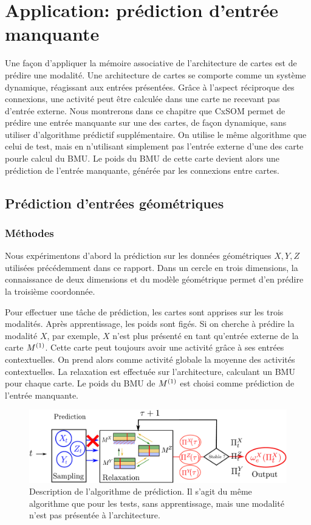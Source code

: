 \chapter{Application: prédiction d'entrée manquante}
\graphicspath{{05-Application/}}
\minitoc

Une façon d'appliquer la mémoire associative de l'architecture de cartes est de prédire une modalité. Une architecture de cartes se comporte comme un système dynamique, réagissant aux entrées présentées.
Grâce à l'aspect réciproque des connexions, une activité peut être calculée dans une carte ne recevant pas d'entrée externe.
Nous montrerons dans ce chapitre que CxSOM permet de prédire une entrée manquante sur une des cartes, de façon dynamique, sans utiliser d'algorithme prédictif supplémentaire. On utilise le même algorithme que celui de test, mais en n'utilisant simplement pas l'entrée externe d'une des carte pourle calcul du BMU. Le poids du BMU de cette carte devient alors une prédiction de l'entrée manquante, générée par les connexions entre cartes.

\section{Prédiction d'entrées géométriques}

\subsection{Méthodes}

Nous expérimentons d'abord la prédiction sur les données géométriques $X,Y,Z$ utilisées précédemment dans ce rapport. Dans un cercle en trois dimensions, la connaissance de deux dimensions et du modèle géométrique permet d'en prédire la troisième coordonnée.

Pour effectuer une tâche de prédiction, les cartes sont apprises sur les trois modalités. Après apprentissage, les poids sont figés. Si on cherche à prédire la modalité $X$, par exemple, $X$ n'est plus présenté en tant qu'entrée externe de la carte $M^{({1})}$. Cette carte peut toujours avoir une activité grâce à ses entrées contextuelles. On prend alors comme activité globale la moyenne des activités contextuelles. La relaxation est effectuée sur l'architecture, calculant un BMU pour chaque carte. Le poids du BMU de $M^{({1})}$ est choisi comme prédiction de l'entrée manquante.


\begin{figure}
\centering
\includegraphics[width=\textwidth]{prediction_setup}
\caption{Description de l'algorithme de prédiction. Il s'agit du même algorithme que pour les tests, sans apprentissage, mais une modalité n'est pas présentée à l'architecture.}
\label{fig:schema}
\end{figure}


